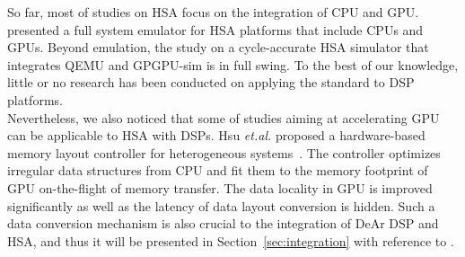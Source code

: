    So far, most of studies on HSA focus on the integration of CPU and GPU. 
    \cite{hsaemu} presented a full system emulator for HSA platforms that include CPUs and GPUs.
    Beyond emulation, the study on a cycle-accurate HSA simulator that integrates QEMU \cite{qemu} and GPGPU-sim \cite{gpgpusim} is in full swing.
    To the best of our knowledge, little or no research has been conducted on applying the standard to DSP platforms.
    \\\indent
    Nevertheless, we also noticed that some of studies aiming at accelerating GPU can be applicable to HSA with DSPs.
    Hsu \textit{et.al.} proposed a hardware-based memory layout controller for heterogeneous systems~\cite{sc}.
    The controller optimizes irregular data structures from CPU and fit them to the memory footprint of GPU on-the-flight of memory transfer.
    The data locality in GPU is improved significantly as well as the latency of data layout conversion is hidden.
    Such a data conversion mechanism is also crucial to the integration of DeAr DSP and HSA, 
    and thus it will be presented in Section~\ref{sec:integration} with reference to \cite{sc}.
